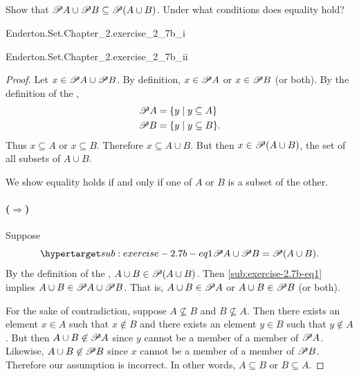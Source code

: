 \documentclass{report}
\begin{document}
\subsection{}%

  Show that $\mathscr{P}A \cup \mathscr{P}B \subseteq \mathscr{P}(A \cup B)$.
  Under what conditions does equality hold?

    {Enderton.Set.Chapter\_2.exercise\_2\_7b\_i}

    {Enderton.Set.Chapter\_2.exercise\_2\_7b\_ii}

  \begin{proof}

    Let $x \in \mathscr{P}A \cup \mathscr{P}B$.
    By definition, $x \in \mathscr{P}A$ or $x \in \mathscr{P}B$ (or both).
    By the definition of the ,
      \begin{align*}
        \mathscr{P}A &= \{ y \mid y \subseteq A \} \\
        \mathscr{P}B &= \{ y \mid y \subseteq B \}.
      \end{align*}
    Thus $x \subseteq A$ or $x \subseteq B$.
    Therefore $x \subseteq A \cup B$.
    But then $x \in \mathscr{P}(A \cup B)$, the set of all subsets of
      $A \cup B$.

    \suitdivider

    We show equality holds if and only if one of $A$ or $B$ is a subset of the
      other.

    \paragraph{($\Rightarrow$)}%

      Suppose
        \begin{equation}
          \hyperlabel{sub:exercise-2.7b-eq1}
          \powerset{A} \cup \powerset{B} = \powerset{(A \cup B)}.
        \end{equation}
      By the definition of the ,
        $A \cup B \in \mathscr{P}(A \cup B)$.
      Then \eqref{sub:exercise-2.7b-eq1} implies
        $A \cup B \in \mathscr{P}A \cup \mathscr{P}B$.
      That is, $A \cup B \in \mathscr{P}A$ or $A \cup B \in \mathscr{P}B$ (or
        both).

      For the sake of contradiction, suppose $A \not\subseteq B$ and
        $B \not\subseteq A$.
      Then there exists an element $x \in A$ such that $x \not\in B$ and there
        exists an element $y \in B$ such that $y \not\in A$.
      But then $A \cup B \not\in \mathscr{P}A$ since $y$ cannot be a member of a
        member of $\mathscr{P}A$.
      Likewise, $A \cup B \not\in \mathscr{P}B$ since $x$ cannot be a member of
        a member of $\mathscr{P}B$.
      Therefore our assumption is incorrect.
      In other words, $A \subseteq B$ or $B \subseteq A$.


\end{proof}
\end{document}
